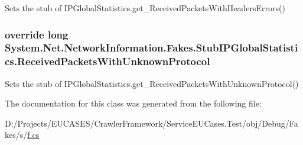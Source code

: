Sets the stub of I\-P\-Global\-Statistics.\-get\-\_\-\-Received\-Packets\-With\-Headers\-Errors()

\hypertarget{class_system_1_1_net_1_1_network_information_1_1_fakes_1_1_stub_i_p_global_statistics_af51e1ece2287dd48b41ae4fd1f2e7831}{
\subsubsection[{Received\-Packets\-With\-Unknown\-Protocol}]{\setlength{\rightskip}{0pt plus 5cm}override long System.\-Net.\-Network\-Information.\-Fakes.\-Stub\-I\-P\-Global\-Statistics.\-Received\-Packets\-With\-Unknown\-Protocol\hspace{0.3cm}{\ttfamily [get]}}}\label{class_system_1_1_net_1_1_network_information_1_1_fakes_1_1_stub_i_p_global_statistics_af51e1ece2287dd48b41ae4fd1f2e7831}


Sets the stub of I\-P\-Global\-Statistics.\-get\-\_\-\-Received\-Packets\-With\-Unknown\-Protocol()



The documentation for this class was generated from the following file\-:\begin{DoxyCompactItemize}
\item 
D\-:/\-Projects/\-E\-U\-C\-A\-S\-E\-S/\-Crawler\-Framework/\-Service\-E\-U\-Cases.\-Test/obj/\-Debug/\-Fakes/s/\hyperlink{s_2f_8cs}{f.\-cs}\end{DoxyCompactItemize}
